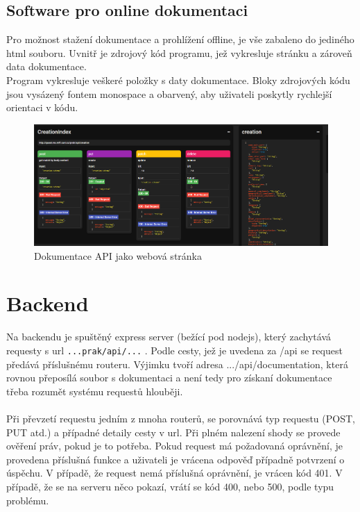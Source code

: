 \subsection{Software pro online dokumentaci}
Pro možnost stažení dokumentace a prohlížení offline, je vše zabaleno do jediného html souboru.
Uvnitř je zdrojový kód programu, jež vykresluje stránku a zároveň data dokumentace.
\\
Program vykresluje veškeré položky s daty dokumentace.
Bloky zdrojových kódu jsou vysázený fontem monospace a obarvený, aby uživateli
poskytly rychlejší orientaci v kódu.
\\
\begin{figure}[H]
	\centering
	\includegraphics[width=\linewidth]{img/documentationPreview.PNG}
	\caption{Dokumentace API jako webová stránka}
\end{figure}


\section{Backend}
Na backendu je spuštěný express server (bežící pod nodejs), který
zachytává requesty s url \texttt{...prak/api/...} .
Podle cesty, jež je uvedena za /api se request předává
příslušnému routeru. Výjimku tvoří adresa .../api/documentation, která
rovnou přeposílá soubor s dokumentaci a není tedy pro získaní dokumentace
třeba rozumět systému requestů hlouběji.
\\
\\
Při převzetí requestu jedním z mnoha routerů, se porovnává
typ requestu (POST, PUT atd.) a případné detaily cesty v url.
Při plném nalezení shody se provede ověření práv, pokud je to potřeba.
Pokud request má požadovaná oprávnění, je provedena příslušná funkce
a uživateli je vrácena odpověď případně potvrzení o úspěchu.
V případě, že request nemá příslušná oprávnění, je vrácen kód 401.
V případě, že se na serveru něco pokazí, vrátí se kód 400, nebo 500, podle typu problému.

